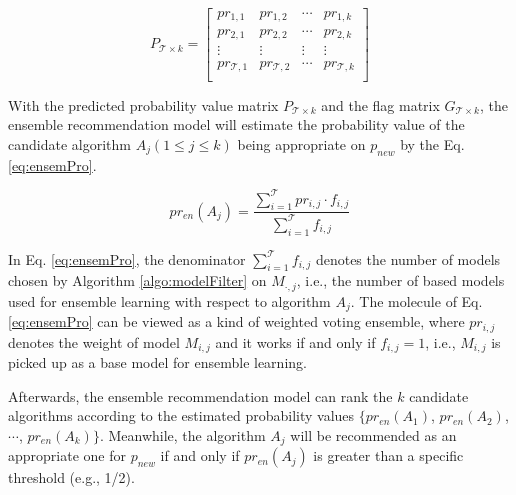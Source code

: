 \documentclass[acmsmall]{acmart}
\begin{document}
\begin{equation}
P_{\mathcal{T}\times k} =\left[
\begin{array}{cccc}
pr_{1,1} & pr_{1,2} & \cdots & pr_{1,k} \\
pr_{2,1} & pr_{2,2} & \cdots & pr_{2,k} \\
\vdots & \vdots &  \vdots & \vdots \\
pr_{\mathcal{T},1} & pr_{\mathcal{T},2} & \cdots & pr_{\mathcal{T},k} \\
\end{array}
\right]
\end{equation}

With the predicted probability value matrix $P_{\mathcal{T}\times k}$ and the
flag matrix $G_{\mathcal{T}\times k}$, the ensemble recommendation model will
estimate the probability value of the candidate algorithm $A_j
(1\leq j\leq k)$ being appropriate on $p_{new}$ by the Eq.
\ref{eq:ensemPro}.

\begin{equation}\label{eq:ensemPro}
pr_{en}(A_j) = \frac{\sum\limits_{i=1}^{\mathcal{T}}pr_{i,j}\cdot f_{i,j}}{\sum\limits_{i=1}^{\mathcal{T}}f_{i,j}}
\end{equation}

In Eq. \ref{eq:ensemPro}, the denominator
$\sum\limits_{i=1}^{\mathcal{T}}f_{i,j}$ denotes the number of models chosen
by Algorithm \ref{algo:modelFilter} on $M_{\cdot,j}$, i.e., the
number of based models used for ensemble learning with respect to
algorithm $A_j$. The molecule of Eq. \ref{eq:ensemPro} can be viewed
as a kind of weighted voting ensemble, where $pr_{i,j}$ denotes the
weight of model $M_{i,j}$ and it works if and only if $f_{i,j} = 1$,
i.e., $M_{i,j}$ is picked up as a base model for ensemble learning.

Afterwards, the ensemble recommendation model can rank the $k$
candidate algorithms according to the estimated probability values
$\{pr_{en}(A_1)$, $pr_{en}(A_2)$, $\cdots$, $pr_{en}(A_k)\}$.
Meanwhile, the algorithm $A_j$ will be recommended as an appropriate
one for $p_{new}$ if and only if $pr_{en}(A_j)$ is greater than a
specific threshold (e.g., 1/2).
\end{document}

